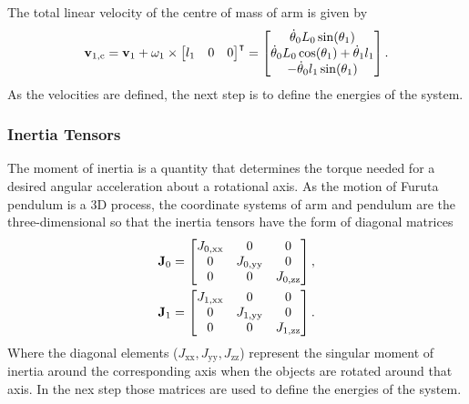 The total linear velocity of the centre of mass of arm is
given by
\begin{equation}
	\text{\textbf{v}}_{1,\text{c}} = \text{\textbf{v}}_1+\omega_1\times
		\begin{bmatrix}
			l_1 & 0& 0
		\end{bmatrix}^\intercal=
	\begin{bmatrix}
		\dot{\theta}_0L_0\sin(\theta_1)\\
		\dot{\theta}_0L_0\cos(\theta_1) + \dot{\theta}_1l_1\\
		-\dot{\theta}_0l_1\sin(\theta_1)
	\end{bmatrix}.														
\end{equation}
As the velocities are defined, the next step is to define the energies of the system.
\subsubsection{Inertia Tensors}
The moment of inertia is a quantity that determines the torque needed for a desired angular acceleration about a rotational axis. As the motion of Furuta pendulum is a 3D process, the coordinate systems of arm and pendulum are the three-dimensional so that the inertia tensors have the form of diagonal matrices
\begin{subequations}
	\begin{align}
	\text{\textbf{J}}_0 = 	\begin{bmatrix}
	J_{0,\text{xx}} & 0 & 0\\
	0 & J_{0,\text{yy}} & 0\\
	0 & 0 & J_{0,\text{zz}}\\
	\end{bmatrix},\\
	\text{\textbf{J}}_1 = 	\begin{bmatrix}
	J_{1,\text{xx}} & 0 & 0\\
	0 & J_{1,\text{yy}} & 0\\
	0 & 0 & J_{1,\text{zz}}\\
	\end{bmatrix}.
	\end{align}
\end{subequations}
Where the diagonal elements ($J_{\text{xx}},J_{\text{yy}},J_{\text{zz}}$) represent the singular moment of inertia around the corresponding axis when the objects are rotated around that axis. In the nex step those matrices are used to define the energies of the system.

